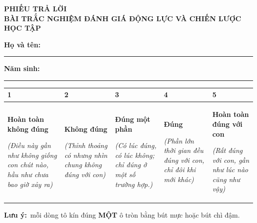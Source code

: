 \documentclass[14pt, a4paper]{extarticle}
\begin{document}
\begin{center}
{\footnotesize\color{muted}\textbf{PHIẾU TRẢ LỜI}}\\[1pt]
{\bfseries\large BÀI TRẮC NGHIỆM ĐÁNH GIÁ ĐỘNG LỰC VÀ CHIẾN LƯỢC HỌC TẬP}
\end{center}
\vspace{2pt}{\color{ink}\rule{\linewidth}{1pt}}
\vspace{2pt}

{\small\textbf{Họ và tên:}~\rule[-2pt]{8.2cm}{0.5pt}\hfill\textbf{Năm sinh:}~\rule[-2pt]{3.1cm}{0.5pt}}
\par\vspace{2pt}

\vspace{-2pt}

\par\vspace{2pt}
\bgroup
\footnotesize
\renewcommand{\arraystretch}{1.5}
\noindent\begin{tabularx}{\linewidth}{|>{\centering\arraybackslash}X|>{\centering\arraybackslash}X|>{\centering\arraybackslash}X|>{\centering\arraybackslash}X|>{\centering\arraybackslash}X|}
\hline
\textbf{1} & \textbf{2} & \textbf{3} & \textbf{4} & \textbf{5} \\ \hline
\textbf{Hoàn toàn không đúng}\par \textit{(Điều này gần như không giống con chút nào, hầu như chưa bao giờ xảy ra)} &
\textbf{Không đúng}\par \textit{(Thỉnh thoảng có nhưng nhìn chung không đúng với con)} &
\textbf{Đúng một phần}\par \textit{(Có lúc đúng, có lúc không; chỉ đúng ở một số trường hợp.)} &
\textbf{Đúng}\par \textit{(Phần lớn thời gian đều đúng với con, chỉ đôi khi mới khác)} &
\textbf{Hoàn toàn đúng với con}\par \textit{(Rất đúng với con, gần như lúc nào cũng như vậy)} \\ \hline
\end{tabularx}
\egroup
\vspace{1pt}
{\small\textbf{Lưu ý:}~mỗi dòng tô kín đúng \textbf{MỘT} ô tròn bằng bút mực hoặc bút chì đậm.}
\vspace{1pt}
\end{document}
